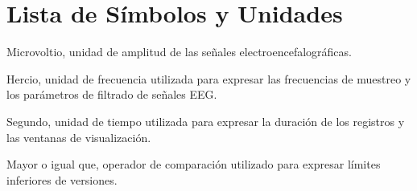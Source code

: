 
\chapter*{Lista de Símbolos y Unidades\hfill}

\begin{abbreviations}

    \item[$\mu$V] Microvoltio, unidad de amplitud
    de las señales electroencefalográficas.

    \item[Hz] Hercio, unidad de frecuencia utilizada
    para expresar las frecuencias de muestreo
    y los parámetros de filtrado de señales EEG.

    \item[s] Segundo, unidad de tiempo utilizada
    para expresar la duración de los registros
    y las ventanas de visualización.

    \item[$\geq$] Mayor o igual que, operador
    de comparación utilizado para expresar
    límites inferiores de versiones.

\end{abbreviations}
